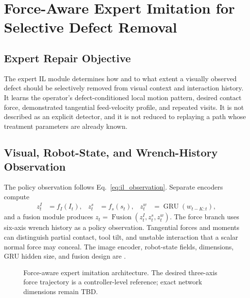 \chapter{Force-Aware Expert Imitation for Selective Defect Removal}
\label{chap:force_il}

\section{Expert Repair Objective}
The expert IL module determines how and to what extent a visually observed defect should be selectively removed from visual context and interaction history. It learns the operator's defect-conditioned local motion pattern, desired contact force, demonstrated tangential feed-velocity profile, and repeated visits. It is not described as an explicit detector, and it is not reduced to replaying a path whose treatment parameters are already known.

\section{Visual, Robot-State, and Wrench-History Observation}
The policy observation follows Eq.~\eqref{eq:il_observation}. Separate encoders compute
\begin{align}
  z_t^I &= f_I(I_t),&
  z_t^s &= f_s(s_t),&
  z_t^w &= \operatorname{GRU}(w_{t-K:t}),
  \label{eq:policy_encoders}
\end{align}
and a fusion module produces \(z_t=\operatorname{Fusion}(z_t^I,z_t^s,z_t^w)\). The force branch uses six-axis wrench history as a policy observation. Tangential forces and moments can distinguish partial contact, tool tilt, and unstable interaction that a scalar normal force may conceal. The image encoder, robot-state fields, dimensions, GRU hidden size, and fusion design are .

\begin{figure}[t]
  \centering
  \caption{Force-aware expert imitation architecture. The desired three-axis force trajectory is a controller-level reference; exact network dimensions remain TBD.}
  \label{fig:force_history_policy}
\end{figure}

